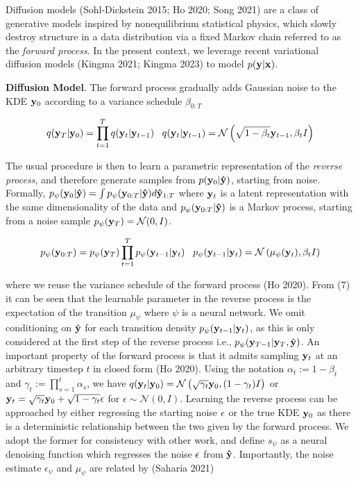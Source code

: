 \documentclass{article}
\begin{document}
Diffusion models (Sohl-Dickstein 2015; Ho 2020; Song 2021) are a class of generative models inspired by nonequilibrium statistical physics, which slowly destroy structure in a data distribution via a fixed Markov chain referred to as the \emph{forward process}. In the present context, we leverage recent variational diffusion models (Kingma 2021; Kingma 2023) to model $p(\bold{y}|\bold{x})$. 

\textbf{Diffusion Model}. The forward process gradually adds Gaussian noise to the KDE $\bold{y}_0$ according to a variance schedule $\beta_{0:T}$

\begin{equation}
q(\bold{y}_{T}|\bold{y}_{0}) = \prod_{t=1}^{T}q(\bold{y}_{t}|\bold{y}_{t-1}) \;\;\; q(\bold{y}_{t}|\bold{y}_{t-1}) = \mathcal{N}\left(\sqrt{1-\beta_{t}}\bold{y}_{t-1},\beta_t I\right)
\end{equation}

The usual procedure is then to learn a parametric representation of the \emph{reverse process}, and therefore generate samples from  $p(\bold{y}_{0}|\bold{\hat{y}})$, starting from noise. Formally, $p_{\psi}(\bold{y}_{0}|\bold{\hat{y}}) = \int p_{\psi}(\bold{y}_{0:T}|\bold{\hat{y}})d\bold{\hat{y}}_{1:T}$ where $\bold{y}_{t}$ is a latent representation with the same dimensionality of the data and $p_{\psi}(\bold{y}_{0:T}|\bold{\hat{y}})$ is a Markov process, starting from a noise sample $p_{\psi}(\bold{y}_{T}) = \mathcal{N}(0,I)$. 

\begin{equation}
p_{\psi}(\bold{y}_{0:T}) = p_{\psi}(\bold{y}_{T})\prod_{t=1}^{T} p_{\psi}(\bold{y}_{t-1}|\bold{y}_{t}) \;\;\; p_{\psi}(\bold{y}_{t-1}|\bold{y}_{t}) = \mathcal{N}\left(\mu_{\psi}(\bold{y}_{t}),\beta_{t}I\right)
\end{equation}

where we reuse the variance schedule of the forward process (Ho 2020). From (7) it can be seen that the learnable parameter in the reverse process is the expectation of the transition $\mu_{\psi}$ where $\psi$ is a neural network. We omit conditioning on $\hat{\bold{y}}$ for each transition density $p_{\psi}(\bold{y}_{t-1}|\bold{y}_{t})$, as this is only considered at the first step of the reverse process i.e., $p_{\psi}(\bold{y}_{T-1}|\bold{y}_{T},\hat{\bold{y}})$. An important property of the forward process is that it admits sampling $\bold{y}_t$ at an arbitrary timestep $t$ in closed form (Ho 2020). Using the notation $\alpha_t := 1 - \beta_t$ and $\gamma_t := \prod_{s=1}^{t} \alpha_s$, we have $q(\bold{y}_t|\bold{y}_0) = \mathcal{N} \left(\sqrt{\gamma_{t}} \bold{y}_{0}, (1 - \gamma_t)I \right)$ or $\bold{y}_{t} = \sqrt{\gamma_{t}}\bold{y}_{0} + \sqrt{1-\gamma_{t}}\bold{\epsilon}$ for $\epsilon \sim \mathcal{N}(0,I)$. Learning the reverse process can be approached by either regressing the starting noise $\bold{\epsilon}$ or the true KDE $\bold{y}_{0}$ as there is a deterministic relationship between the two given by the forward process. We adopt the former for consistency with other work, and define $s_{\psi}$ as a neural denoising function which regresses the noise $\bold{\epsilon}$ from $\bold{\hat{y}}$. Importantly, the noise estimate $\epsilon_{\psi}$ and $\mu_{\psi}$ are related by (Saharia 2021)
\end{document}

